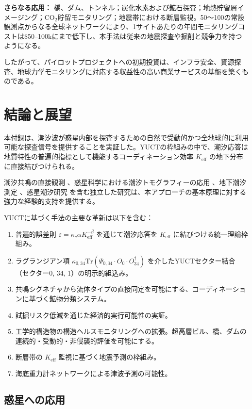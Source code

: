 \documentclass[12pt,a4paper]{article}
\theoremstyle{remark}
\newcommand{\Keff}{K_{\mathrm{eff}}}
\newcommand{\kappac}{\kappa_c}
\newcommand{\eps}{\varepsilon}
\begin{document}
	\textbf{さらなる応用：} 橋、ダム、トンネル；炭化水素および鉱石探査；地熱貯留層イメージング；CO$_2$貯留モニタリング；地震帯における断層監視。50～100の常設観測点からなる全球ネットワークにより、1サイトあたりの年間モニタリングコストは\$50–100kにまで低下し、本手法は従来の地震探査や掘削と競争力を持つようになる。
	
	したがって、パイロットプロジェクトへの初期投資は、インフラ安全、資源探査、地球力学モニタリングに対応する収益性の高い商業サービスの基盤を築くものである。
	
	\section{結論と展望}
	\label{sec:conclusion}
	
	本付録は、潮汐波が惑星内部を探査するための自然で受動的かつ全地球的に利用可能な探査信号を提供することを実証した。YUCTの枠組みの中で、潮汐応答は地質特性の普遍的指標として機能するコーディネーション効率 \(\Keff\) の地下分布に直接結びつけられる。
	
	潮汐共鳴の直接観測 \cite{Sibgatulin2014}、惑星科学における潮汐トモグラフィーの応用 \cite{RoviraNavarro2025}、地下潮汐測定 \cite{Rogister2024}、惑星潮汐研究 \cite{Briaud2025} を含む独立した研究は、本アプローチの基本原理に対する強力な経験的支持を提供する。
	
	YUCTに基づく手法の主要な革新は以下を含む：
	
	\begin{enumerate}
		\item 普遍的誤差則 \(\eps = \kappac \alpha \Keff^{-\beta}\) を通じて潮汐応答を \(\Keff\) に結びつける統一理論枠組み。
		\item ラグランジアン項 \(\kappa_{0,34} \mathrm{Tr}(\Psi_{0,34} \cdot O_0 \cdot O_{34}^\dagger)\) を介したYUCTセクター結合（セクター0, 34, 1）の明示的組込み。
		\item 共鳴シグネチャから流体タイプの直接同定を可能にする、コーディネーションに基づく鉱物分類システム。
		\item 試掘リスク低減を通じた経済的実行可能性の実証。
		\item 工学的構造物の構造ヘルスモニタリングへの拡張。超高層ビル、橋、ダムの連続的・受動的・非侵襲的評価を可能にする。
		\item 断層帯の \(K_{\mathrm{eff}}\) 監視に基づく地震予測の枠組み。
		\item 海底重力計ネットワークによる津波予測の可能性。
	\end{enumerate}
	
	\subsection{惑星への応用}
	
\end{document}
